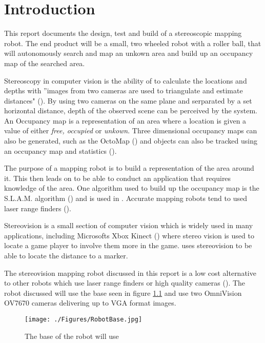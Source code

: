 \chapter{Introduction} \label{Chapter:Introduction}

%
%
%
%


This report documents the design, test and build of a stereoscopic mapping robot. The end product will be a small, two wheeled robot with a roller ball, that will autonomously search and map an unkown area and build up an occupancy map of the searched area. 

Stereoscopy in computer vision is the ability of to calculate the locations and depths with ''images from two cameras are used to triangulate and estimate distances" (\cite{Saxena:DepthEstimation}). By using two cameras on the same plane and serparated by a set horizontal distance, depth of the observed scene can be perceived by the system.
An Occupancy map is a representation of an area where a location is given a value of either \textit{free, occupied} or \textit{unkown}.  Three dimensional occupancy maps can also be generated, such as the OctoMap (\cite{octomap}) and objects can also be tracked using an occupancy map and statistics (\cite{Fleuret:OccupancyMap}). 

The purpose of a mapping robot is to build a representation of the area around it. This then leads on to be able to conduct an application that requires knowledge of the area. One algorithm used to build up the occupancy map is the S.L.A.M. algorithm (\cite{Thrun:SLAM}) and is used in \cite{Se:MappingRobot}. Accurate mapping robots tend to used laser range finders (\cite{Ruhnke:LaserMapping}).

Stereovision is a small section of computer vision which is widely used in many applications, including Microsofts Xbox Kinect (\cite{Microsoft:Kinect}) where stereo vision is used to locate a game player to involve them more in the game. \cite{Mrovlje:Distance_Stereoscopic} uses stereovision to be able to locate the distance to a marker.

The stereovision mapping robot discussed in this report is a low cost alternative to other robots which use laser range finders or high quality cameras (\cite{Se:MappingRobot}). The robot discussed will use the base seen in figure \ref{fig:RobotBase} and use two OmniVision OV7670 cameras delivering up to VGA format images.

\begin{figure}
\texttt{[image: ./Figures/RobotBase.jpg]}
\caption{The base of the robot will use}
\label{fig:RobotBase}
\end{figure}